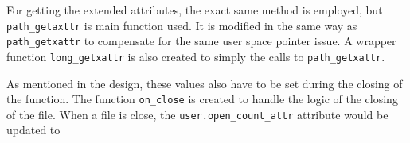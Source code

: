 For getting the extended attributes, the exact same method is employed, but \texttt{path\_getaxttr} is main function used. It is modified in the same way as \texttt{path\_getxattr} to compensate for the same user space pointer issue. A wrapper function \texttt{long\_getxattr} is also created to simply the calls to \texttt{path\_getxattr}.

As mentioned in the design, these values also have to be set during the closing of the function. The function \texttt{on\_close} is created to handle the logic of the closing of the file. When a file is close, the \texttt{user.open\_count\_attr} attribute would be updated to 